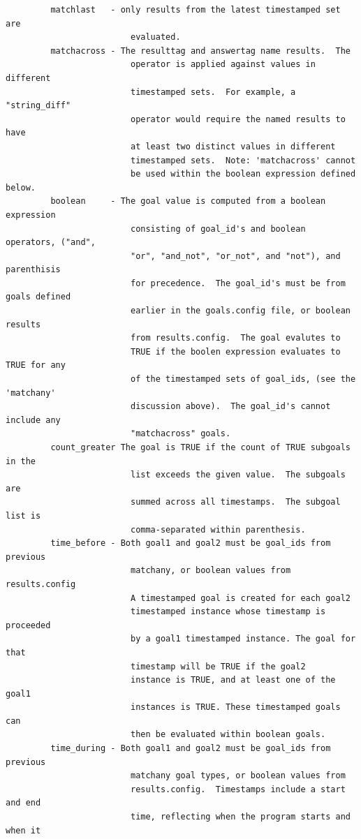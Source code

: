 \documentclass[12pt]{article}
\begin{document}
\begin{verbatim}
         matchlast   - only results from the latest timestamped set are 
                         evaluated.
         matchacross - The resulttag and answertag name results.  The 
                         operator is applied against values in different 
                         timestamped sets.  For example, a "string_diff" 
                         operator would require the named results to have 
                         at least two distinct values in different 
                         timestamped sets.  Note: 'matchacross' cannot 
                         be used within the boolean expression defined below.
         boolean     - The goal value is computed from a boolean expression 
                         consisting of goal_id's and boolean operators, ("and", 
                         "or", "and_not", "or_not", and "not"), and parenthisis 
                         for precedence.  The goal_id's must be from goals defined 
                         earlier in the goals.config file, or boolean results
                         from results.config.  The goal evalutes to 
                         TRUE if the boolen expression evaluates to TRUE for any
                         of the timestamped sets of goal_ids, (see the 'matchany' 
                         discussion above).  The goal_id's cannot include any 
                         "matchacross" goals.
         count_greater The goal is TRUE if the count of TRUE subgoals in the 
                         list exceeds the given value.  The subgoals are 
                         summed across all timestamps.  The subgoal list is 
                         comma-separated within parenthesis.
         time_before - Both goal1 and goal2 must be goal_ids from previous 
                         matchany, or boolean values from results.config
                         A timestamped goal is created for each goal2 
                         timestamped instance whose timestamp is proceeded 
                         by a goal1 timestamped instance. The goal for that
                         timestamp will be TRUE if the goal2
                         instance is TRUE, and at least one of the goal1
                         instances is TRUE. These timestamped goals can
                         then be evaluated within boolean goals.
         time_during - Both goal1 and goal2 must be goal_ids from previous 
                         matchany goal types, or boolean values from 
                         results.config.  Timestamps include a start and end 
                         time, reflecting when the program starts and when it 

\end{verbatim}
\end{document}
